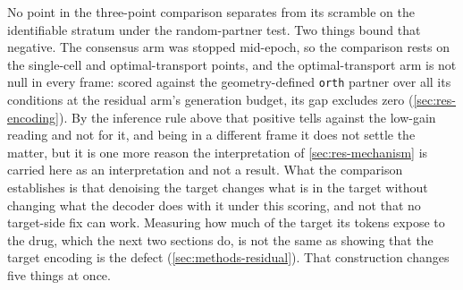 \begin{claim}
No point in the three-point comparison separates from its scramble on the
identifiable stratum under the random-partner test. Two things bound that
negative. The consensus arm was stopped mid-epoch, so the comparison rests on the
single-cell and optimal-transport points, and the optimal-transport arm is not
null in every frame: scored against the geometry-defined \texttt{orth} partner
over all its conditions at the residual arm's generation budget, its gap excludes
zero (\cref{sec:res-encoding}). By the inference rule above that positive tells
against the low-gain reading and not for it, and being in a different frame
it does not settle the matter, but it is one more reason the interpretation of
\cref{sec:res-mechanism} is carried here as an interpretation and not a result.
What the comparison establishes is that denoising the target changes what is in
the target without changing what the decoder does with it under this scoring, and
not that no target-side fix can work. Measuring how much of the target its tokens
expose to the drug, which the next two sections do, is not the same as showing
that the target encoding is the defect (\cref{sec:methods-residual}). That
construction changes five things at once.
\end{claim}
